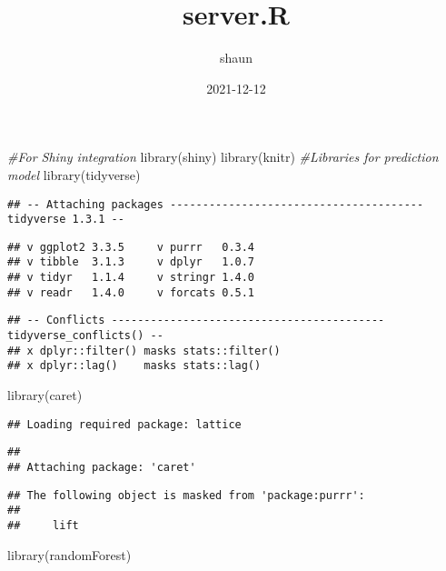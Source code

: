 \documentclass[
]{article}
\title{server.R}
\author{shaun}
\date{2021-12-12}
\newenvironment{Shaded}{\begin{snugshade}}{\end{snugshade}}
\newcommand{\CommentTok}[1]{\textcolor[rgb]{0.56,0.35,0.01}{\textit{#1}}}
\newcommand{\FunctionTok}[1]{\textcolor[rgb]{0.00,0.00,0.00}{#1}}
\newcommand{\NormalTok}[1]{#1}
\begin{document}
\maketitle

\begin{Shaded}
\begin{Highlighting}[]
\CommentTok{\#For Shiny integration}
\FunctionTok{library}\NormalTok{(shiny)}
\FunctionTok{library}\NormalTok{(knitr)}
\CommentTok{\#Libraries for prediction model}
\FunctionTok{library}\NormalTok{(tidyverse)}
\end{Highlighting}
\end{Shaded}

\begin{verbatim}
## -- Attaching packages --------------------------------------- tidyverse 1.3.1 --
\end{verbatim}

\begin{verbatim}
## v ggplot2 3.3.5     v purrr   0.3.4
## v tibble  3.1.3     v dplyr   1.0.7
## v tidyr   1.1.4     v stringr 1.4.0
## v readr   1.4.0     v forcats 0.5.1
\end{verbatim}

\begin{verbatim}
## -- Conflicts ------------------------------------------ tidyverse_conflicts() --
## x dplyr::filter() masks stats::filter()
## x dplyr::lag()    masks stats::lag()
\end{verbatim}

\begin{Shaded}
\begin{Highlighting}[]
\FunctionTok{library}\NormalTok{(caret)}
\end{Highlighting}
\end{Shaded}

\begin{verbatim}
## Loading required package: lattice
\end{verbatim}

\begin{verbatim}
## 
## Attaching package: 'caret'
\end{verbatim}

\begin{verbatim}
## The following object is masked from 'package:purrr':
## 
##     lift
\end{verbatim}

\begin{Shaded}
\begin{Highlighting}[]
\FunctionTok{library}\NormalTok{(randomForest)}
\end{Highlighting}
\end{Shaded}
\end{document}
